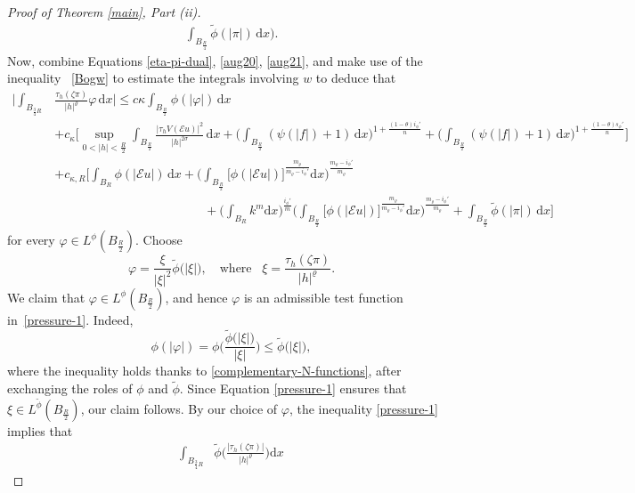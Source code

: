 \documentclass[leqno,11pt]{amsart}%
\numberwithin{equation}{section}
\def\d{\mathrm{d}}
\def\E{\mathcal{E}}
\def\dx{\d x}
\theoremstyle{definition}
\numberwithin{equation}{section}
\begin{document}
\begin{proof}[Proof of Theorem \ref{main}, Part (ii)]
\begin{align}
    \int_{B_{\frac R4}}\widetilde \phi(|\pi|)\,\dx
    \bigg).
\end{align}
Now, combine Equations \eqref{eta-pi-dual}, \eqref{aug20}, \eqref{aug21}, and make use of 
the inequality ~\eqref{Bogw} to estimate the integrals involving $w$ to deduce that 
\begin{align}\label{pressure-1}
  \bigg|\int_{B_{{\frac 34R}}}&\frac{\tau_h(\zeta\pi)}{|h|^\varrho}\varphi\,\dx\bigg|
\le
   c\kappa\int_{B_{\frac R2}}\phi(|\varphi|)\,\dx 
   \\ \nonumber & + 
   c_\kappa \Bigg[\sup_{0<|h|<\frac R2}
\int_{B_{\frac R2}}\frac{|\tau_hV(\E u)|^2}{|h|^{2\sigma}}\, \d x +\bigg(\int_{B_{\frac R2}}(\psi(|f|)+1)\,\dx\bigg)^{1+\frac{({1-\theta}) i_\phi'}{n}}
 +
\bigg(\int_{B_{\frac R2}}(\psi(|f|)+1)\,\dx\bigg)^{1+\frac{({1-\theta}) s_\phi'}{n}}\Bigg]
\\ \nonumber
& +  c_{\kappa,R} \Bigg[
 \int_{B_{R}}\phi(|\E u|)\,\dx +
\bigg(\int_{B_{\frac R2}}\big[\phi(|\E u|)\big]^{\frac{{m_\varrho}}{{m_\varrho}-i_\phi'}}\dx\bigg)^{\frac{{m_\varrho}-i_\phi'}{{m_\varrho}}}
\\ \nonumber & \qquad \qquad \qquad \qquad \qquad \qquad +  \bigg(\int_{B_{R}}{k}^{{m}}\dx\bigg)^{\frac{i_\phi'}{  {m}}}\bigg(\int_{B_{\frac R2}}\big[\phi(|\E u|)\big]^{\frac{  {m_\varrho}}{  {m_\varrho}-i_\phi'}}\dx\bigg)^{\frac{  {m_\varrho}-i_\phi'}{  {m_\varrho}}} +\int_{B_{\frac R2}}\widetilde \phi(|\pi|)\,\dx\Bigg]
\end{align}
for every $\varphi\in L^{\phi}(B_{\frac R2})$.
 Choose
\begin{equation}\label{aug23}
  \varphi=\frac{\xi}{|\xi|^2}\widetilde \phi\big(|\xi|\big),
  \quad\mbox{where } \,\,\,\xi=\frac{\tau_h(\zeta\pi)}{|h|^\varrho}.
\end{equation}
We claim that $\varphi\in L^\phi(B_{\frac R2})$, and hence 
 $\varphi$
is an admissible test function in~\eqref{pressure-1}.
Indeed,
\begin{equation*}
  \phi(|\varphi|)
  =
\phi\bigg(\frac{\widetilde \phi\big(|\xi|\big)}{|\xi|}
  \bigg)
  \le \widetilde 
 \phi\big(|\xi|\big),
\end{equation*}
where the inequality holds thanks to \eqref{complementary-N-functions}, after exchanging the roles of $\phi$ and $\widetilde \phi$. Since Equation \eqref{pressure-1} ensures that
$\xi\in
L^{\widetilde \phi}(B_{\frac R2})$, our claim follows.  
By our choice of $\varphi$, the inequality \eqref{pressure-1}
implies that
\begin{align}\label{oct10'}
   \int_{B_{\frac 34R}}&\widetilde \phi\bigg(\frac{|\tau_h(\zeta\pi)|}{|h|^\varrho}\bigg)\dx

\end{align}
\end{proof}
\end{document}
